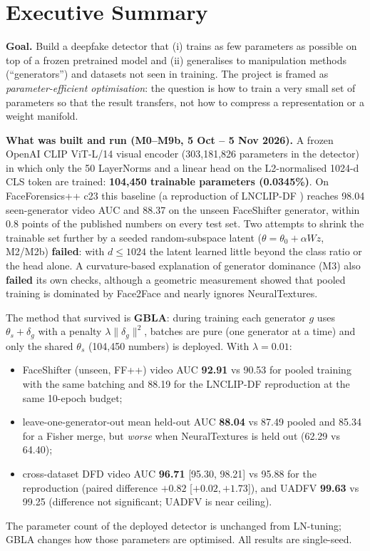 \documentclass[10pt,a4paper]{article}
\begin{document}
\section*{Executive Summary}

\textbf{Goal.} Build a deepfake detector that (i) trains as few parameters as possible on top of a
frozen pretrained model and (ii) generalises to manipulation methods (``generators'') and datasets
not seen in training. The project is framed as \emph{parameter-efficient optimisation}: the
question is how to train a very small set of parameters so that the result transfers, not how to
compress a representation or a weight manifold.

\textbf{What was built and run (M0--M9b, 5 Oct -- 5 Nov 2026).}
A frozen OpenAI CLIP ViT-L/14 visual encoder (303,181,826 parameters in the detector) in which only
the 50 LayerNorms and a linear head on the L2-normalised 1024-d CLS token are trained:
\textbf{104,450 trainable parameters (0.0345\%)}. On FaceForensics++ c23 this baseline (a
reproduction of LNCLIP-DF \cite{yermakov2025lnclip}) reaches 98.04 seen-generator video AUC and
88.37 on the unseen FaceShifter generator, within 0.8 points of the published numbers on every
test set. Two attempts to shrink the trainable set further by a seeded random-subspace latent
(\(\theta=\theta_0+\alpha Wz\), M2/M2b) \textbf{failed}: with \(d\le 1024\) the latent learned
little beyond the class ratio or the head alone. A curvature-based explanation of
generator dominance (M3) also \textbf{failed} its own checks, although a geometric measurement showed
that pooled training is dominated by Face2Face and nearly ignores NeuralTextures.

The method that survived is \textbf{GBLA}: during training each generator \(g\) uses
\(\theta_s+\delta_g\) with a penalty \(\lambda\|\delta_g\|^2\), batches are pure (one generator at a
time) and only the shared \(\theta_s\) (104,450 numbers) is deployed. With \(\lambda=0.01\):
\begin{itemize}
\item FaceShifter (unseen, FF++) video AUC \textbf{92.91} vs 90.53 for pooled training with the
same batching and 88.19 for the LNCLIP-DF reproduction at the same 10-epoch budget;
\item leave-one-generator-out mean held-out AUC \textbf{88.04} vs 87.49 pooled and 85.34 for a
Fisher merge, but \emph{worse} when NeuralTextures is held out (62.29 vs 64.40);
\item cross-dataset DFD video AUC \textbf{96.71} [95.30, 98.21] vs 95.88 for the reproduction
(paired difference \(+0.82\) [\(+0.02,+1.73\)]), and UADFV \textbf{99.63} vs 99.25 (difference not
significant; UADFV is near ceiling).
\end{itemize}
The parameter count of the deployed detector is unchanged from LN-tuning; GBLA changes how those
parameters are optimised. All results are single-seed.
\end{document}
